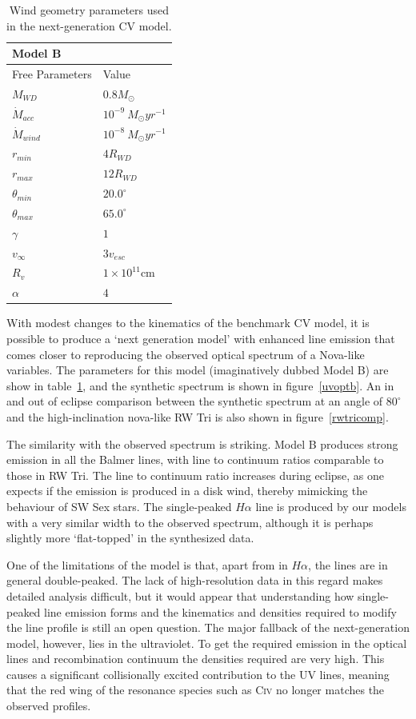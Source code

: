 \documentclass[preprint, a4paper, 11pt]{aastex}
\begin{document}
\begin{table}
\centering
\begin{tabular}{p{3cm}p{4cm}}
Model B \\
\hline Free Parameters 	&	 Value \\ 
\hline \hline 
$M_{WD}$ 	 &	 $0.8 M_{\odot}$ \\ 
$\dot{M}_{acc}$ 	 &	 $10^{-9}~M_{\odot}yr^{-1}$\\ 
$\dot{M}_{wind}$  &	$10^{-8}~M_{\odot}yr^{-1}$\\ 
$r_{min}$ 	&	 $4 R_{WD}$\\ 
$r_{max}$ 	&	 $12 R_{WD}$ \\ 
$\theta_{min}$ 	&	 $20.0^{\circ}$ \\ 
$\theta_{max}$ 	&	 $65.0^{\circ}$ \\ 
$\gamma$ 	&	 $1$ \\ 
$v_{\infty}$ 	&	 $3v_{esc}$ \\ 
$R_v$ 	        &	 $1\times10^{11}$cm \\ 
$\alpha$ 	&	 $4$ \\
\end{tabular}
\centering
\caption{Wind geometry parameters used in the next-generation CV model.}
\label{modelb}
\end{table}

With modest changes to the kinematics of the benchmark CV model,
it is possible to produce a `next generation model' with enhanced
line emission that comes closer to reproducing the observed optical spectrum
of a Nova-like variables. The parameters for this model (imaginatively dubbed Model B)
are show in table~\ref{modelb}, and the synthetic spectrum
is shown in figure~\ref{uvoptb}. An in and out of eclipse comparison 
between the synthetic spectrum
at an angle of $80^\circ$ and the high-inclination nova-like RW Tri 
is also shown in figure~\ref{rwtricomp}.

The similarity with the observed spectrum is striking. 
Model B produces strong emission in all the Balmer lines, 
with line to continuum ratios
comparable to those in RW Tri. 
The line to continuum ratio increases during eclipse,
as one expects if the emission is produced in a disk wind, 
thereby mimicking the behaviour of SW Sex stars.
The single-peaked $H\alpha$ line is produced by our models with a 
very similar width to the observed spectrum, although it is perhaps slightly more
`flat-topped' in the synthesized data.

One of the limitations of the model is that, apart 
from in $H\alpha$, the lines are in general double-peaked. 
The lack of high-resolution data in this regard makes detailed analysis difficult,
but it would appear that understanding how single-peaked 
line emission forms and the kinematics and densities required to
modify the line profile is still an open question. 
The major fallback of the next-generation model, however, lies
in the ultraviolet. To get the required emission in the optical lines
and recombination continuum the densities required are very high.
This causes a significant collisionally excited contribution
to the UV lines, meaning that the red wing of the 
resonance species such as C\textsc{iv} no longer matches the
observed profiles. 
\end{document}
